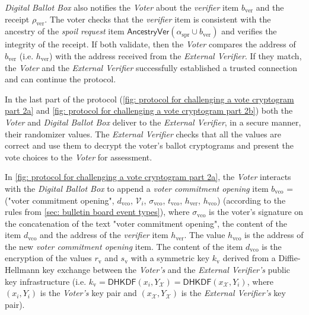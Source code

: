 \textit{Digital Ballot Box} also notifies the \textit{Voter} about the \textit{verifier} item $b_\mathrm{ver}$ and the receipt $\rho_\mathrm{ver}$. The voter checks that the \textit{verifier} item is consistent with the ancestry of the \textit{spoil request} item $\mathsf{AncestryVer}(\alpha_\mathrm{spr} \cup b_\mathrm{ver})$ and verifies the integrity of the receipt. If both validate, then the \textit{Voter} compares the address of $b_\mathrm{ver}$ (i.e. $h_\mathrm{ver}$) with the address received from the \textit{External Verifier}. If they match, the \textit{Voter} and the \textit{External Verifier} successfully established a trusted connection and can continue the protocol.

In the last part of the protocol (\cref{fig: protocol for challenging a vote cryptogram part 2a} and \cref{fig: protocol for challenging a vote cryptogram part 2b}) both the \textit{Voter} and \textit{Digital Ballot Box} deliver to the \textit{External Verifier}, in a secure manner, their randomizer values. The \textit{External Verifier} checks that all the values are correct and use them to decrypt the voter's ballot cryptograms and present the vote choices to the \textit{Voter} for assessment.

In \cref{fig: protocol for challenging a vote cryptogram part 2a}, the \textit{Voter} interacts with the \textit{Digital Ballot Box} to append a \textit{voter commitment opening} item $b_\mathrm{vco}$ = ("voter commitment opening", $d_\mathrm{vco}$, $\mathcal{V}_i$, $\sigma_\mathrm{vco}$, $t_\mathrm{vco}$, $h_\mathrm{ver}$, $h_\mathrm{vco}$) (according to the rules from \cref{sec: bulletin board event types}), where $\sigma_\mathrm{vco}$ is the voter's signature on the concatenation of the text "voter commitment opening", the content of the item $d_\mathrm{vco}$ and the address of the \textit{verifier} item $h_\mathrm{ver}$. The value $h_\mathrm{vco}$ is the address of the new \textit{voter commitment opening} item. The content of the item $d_\mathrm{vco}$ is the encryption of the values $r_\mathrm{v}$ and $s_\mathrm{v}$ with a symmetric key $k_\mathrm{v}$ derived from a Diffie-Hellmann key exchange between the \textit{Voter's} and the \textit{External Verifier's} public key infrastructure (i.e. $k_\mathrm{v} = \mathsf{DHKDF}(x_i, Y_\mathcal{X}) = \mathsf{DHKDF}(x_\mathcal{X}, Y_i)$, where $(x_i, Y_i)$ is the \textit{Voter's} key pair and $(x_\mathcal{X}, Y_\mathcal{X})$ is the \textit{External Verifier's} key pair). 

